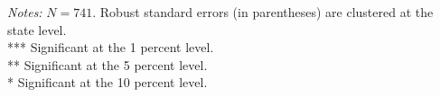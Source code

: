 \begin{frame}
\begin{table}[ht]
{\begin{tabular}{rcccccccccccc}
            \bottomrule
            \end{tabular}
        }
        \vspace{0.2cm}
        
        \begin{minipage}{\linewidth}
            \tiny
            \textit{Notes:} $N = 741$. Robust standard errors (in parentheses) are clustered at the state level.\\
            *** Significant at the 1 percent level. \\
            ** Significant at the 5 percent level. \\
            * Significant at the 10 percent level.
        \end{minipage}
    \end{table}
\end{frame}


                                                                        

                                                                        

                                                                        
